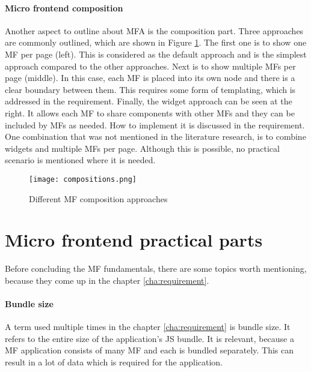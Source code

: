 \paragraph{Micro frontend composition}\label{cha:theroy_extensions_composition}

Another aspect to outline about \ac{MFA} is the composition part.
Three approaches are commonly outlined, which are shown in Figure \ref{img:compositions}.
The first one is to show one \ac{MF} per page (left).
This is considered as the default approach and is the simplest approach compared to the other approaches.
Next is to show multiple \acp{MF} per page (middle).
In this case, each \ac{MF} is placed into its own node and there is a clear boundary between them.
This requires some form of templating, which is addressed in the \textit{} requirement.
Finally, the widget approach can be seen at the right.
It allows each \ac{MF} to share components with other \acp{MF} and they can be included by \acp{MF} as needed.
How to implement it is discussed in the \textit{} requirement.
One combination that was not mentioned in the literature research, is to combine widgets and multiple \acp{MF} per page.
Although this is possible, no practical scenario is mentioned where it is needed.

\begin{figure}[h]
    \centering
    \texttt{[image: compositions.png]}
    \caption{Different \ac{MF} composition approaches}
    \label{img:compositions}
\end{figure}



\section{Micro frontend practical parts}\label{cha:theory_practic}

Before concluding the \ac{MF} fundamentals, there are some topics worth mentioning, because they come up in the chapter \ref{cha:requirement}.



\paragraph{Bundle size}

A term used multiple times in the chapter \ref{cha:requirement} is bundle size.
It refers to the entire size of the application's \ac{JS} bundle.
It is relevant, because a \ac{MF} application consists of many \ac{MF} and each is bundled separately.
This can result in a lot of data which is required for the application.



